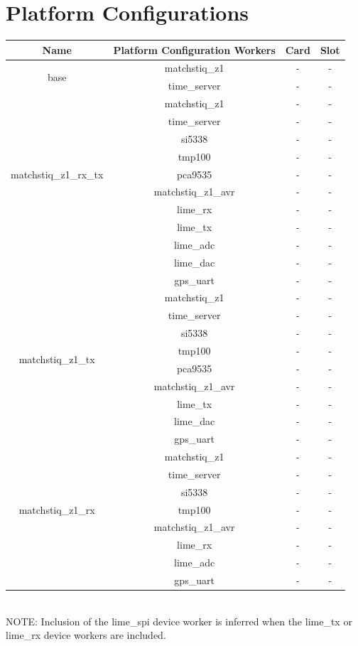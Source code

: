 \documentclass{article}
\def\comp{matchstiq\_z1}
\begin{document}
\section*{Platform Configurations}
	\begin{tabular}{|c|c|c|c|}
		\hline
		\rowcolor{blue}
		Name & Platform Configuration Workers & Card & Slot \\
		\hline
		\multirow{2}{*}{base} &\comp & - & - \\ &time\_server & - & - \\
		\hline
		\multirow{9}{*}{matchstiq\_z1\_rx\_tx} &\comp & - & - \\ &time\_server & - & - \\ &si5338 & - & - \\ &tmp100 & - & - \\ &pca9535 & - & - \\ &matchstiq\_z1\_avr & - & - \\ &lime\_rx & - & - \\ &lime\_tx & - & - \\ &lime\_adc & - & - \\ &lime\_dac & - & - \\&gps\_uart & - & - \\
		\hline
		\multirow{8}{*}{matchstiq\_z1\_tx} &\comp & - & - \\ &time\_server & - & - \\ &si5338 & - & - \\ &tmp100 & - & - \\ &pca9535 & - & - \\ &matchstiq\_z1\_avr & - & - \\ &lime\_tx & - & - \\ &lime\_dac & - & - \\ &gps\_uart & - & - \\
		\hline
		\multirow{7}{*}{matchstiq\_z1\_rx} &\comp & - & - \\ &time\_server & - & - \\ &si5338 & - & - \\ &tmp100 & - & - \\ &matchstiq\_z1\_avr & - & - \\ &lime\_rx & - & - \\ &lime\_adc & - & - \\&gps\_uart & - & - \\
		\hline
	\end{tabular} \\

\noindent NOTE: Inclusion of the lime\_spi device worker is inferred when the lime\_tx or lime\_rx device workers are included.
\end{document}
